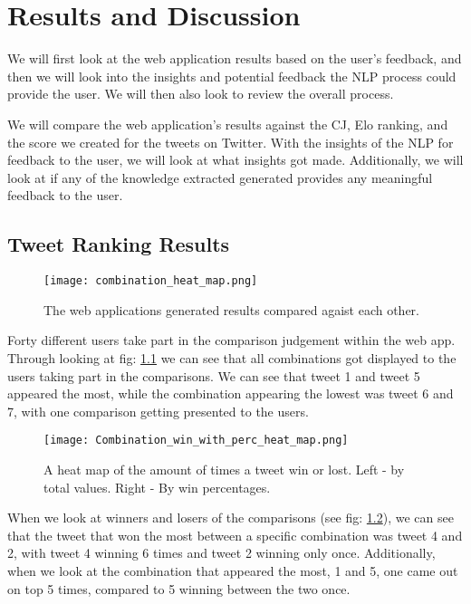 \chapter{Results and Discussion}
\label{chap:results}

We will first look at the web application results based on the user's feedback, and then we will look into the insights and potential feedback the NLP process could provide the user. We will then also look to review the overall process. 

We will compare the web application's results against the CJ, Elo ranking, and the score we created for the tweets on Twitter. With the insights of the NLP for feedback to the user, we will look at what insights got made. Additionally, we will look at if any of the knowledge extracted generated provides any meaningful feedback to the user.



\section{Tweet Ranking Results} 
\label{sec:reaults_ranking}

	\begin{figure}[h]
		\centering
		\texttt{[image: combination\_heat\_map.png]}
		\caption{The web applications generated results compared agaist each other.}
		\label{fig:combinations}
		
	\end{figure}
	
	Forty different users take part in the comparison judgement within the web app. Through looking at fig: \ref{fig:combinations} we can see that all combinations got displayed to the users taking part in the comparisons. We can see that tweet 1 and tweet 5 appeared the most, while the combination appearing the lowest was tweet 6 and 7, with one comparison getting presented to the users.
	
	\begin{figure}[t]
		\centering
		\texttt{[image: Combination\_win\_with\_perc\_heat\_map.png]}
		\caption{A heat map of the amount of times a tweet win or lost. Left - by total values. Right - By win percentages.}
		\label{fig:Combination_win_with_perc_heat_map}
		
	\end{figure}
	
	
	
	When we look at winners and losers of the comparisons (see fig: \ref{fig:Combination_win_with_perc_heat_map}), we can see that the tweet that won the most between a specific combination was tweet 4 and 2, with tweet 4 winning 6 times and tweet 2 winning only once. Additionally, when we look at the combination that appeared the most, 1 and 5, one came out on top 5 times, compared to 5 winning between the two once.
	
